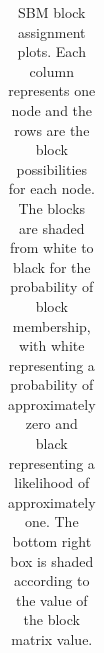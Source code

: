 \documentclass[fleqn,12pt]{wlscirep}
\begin{document}
\begin{longtable}[!h]{c@{\hskip 0cm}c}
\caption{\label{fig:SBM_plot_1} SBM block assignment plots. Each column represents one node and the rows are the block possibilities for each node. The blocks are shaded from white to black for the probability of block membership, with white representing a probability of approximately zero and black representing a likelihood of approximately one. The bottom right box is shaded according to the value of the block matrix value.}
\end{longtable}





\clearpage



\end{document}
